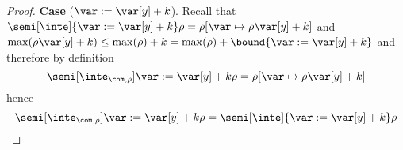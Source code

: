 \begin{proof}
  \noindent
  \textbf{Case} (\(\var := \var[y] + k\)).
  Recall that
  \({\semi[\inte]{\var := \var[y] + k}\rho} = {\rho[\var \mapsto
    \rho\var[y] + k]}\) and
  \({\max(\rho\var[y] + k)} \leq {\max(\rho) + k} = {\max(\rho) +
    \bound{\var := \var[y] + k}}\) and therefore by definition
  \begin{equation*}
    \semi[\inte_{\com,\rho}]{\var := \var[y] + k}\rho = \rho[\var \mapsto \rho\var[y] + k]
  \end{equation*}
  hence
  \begin{equation*}
    \semi[\inte_{\com,\rho}]{\var := \var[y] + k}\rho = \semi[\inte]{\var := \var[y] + k}\rho
  \end{equation*}

  \medskip


\end{proof}
